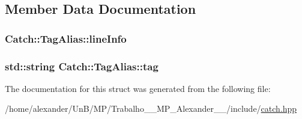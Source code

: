 \subsection{Member Data Documentation}
\hypertarget{structCatch_1_1TagAlias_a2f51fe0b3c052561275d26b6eb88f702}{
\subsubsection[{line\-Info}]{ Catch\-::\-Tag\-Alias\-::line\-Info}}\label{structCatch_1_1TagAlias_a2f51fe0b3c052561275d26b6eb88f702}
\hypertarget{structCatch_1_1TagAlias_a950183883ab17c90d0fab16b966b6e2d}{
\subsubsection[{tag}]{\setlength{\rightskip}{0pt plus 5cm}std\-::string Catch\-::\-Tag\-Alias\-::tag}}\label{structCatch_1_1TagAlias_a950183883ab17c90d0fab16b966b6e2d}


The documentation for this struct was generated from the following file\-:\begin{DoxyCompactItemize}
\item 
/home/alexander/\-Un\-B/\-M\-P/\-Trabalho\-\_\-\_\-\-M\-P\-\_\-\-Alexander\-\_\-\_/include/\hyperlink{catch_8hpp}{catch.\-hpp}\end{DoxyCompactItemize}
